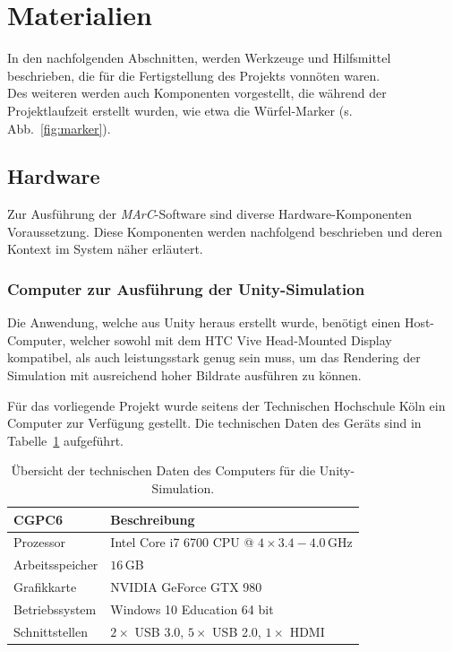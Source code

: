 \section{Materialien}\label{sec:Materialien}
In den nachfolgenden Abschnitten, werden Werkzeuge und Hilfsmittel beschrieben, die für die Fertigstellung des Projekts vonnöten waren.\\ Des weiteren werden auch Komponenten vorgestellt, die während der Projektlaufzeit erstellt wurden, wie etwa die Würfel-Marker (s. Abb.~\ref{fig:marker}).

\subsection{Hardware}
Zur Ausführung der \emph{MArC}-Software sind diverse Hardware-Komponenten Voraussetzung. Diese Komponenten werden nachfolgend beschrieben und deren Kontext im System näher erläutert.
\subsubsection{Computer zur Ausführung der Unity-Simulation}\label{sec:UnityComp}
Die Anwendung, welche aus Unity \cite{website:Unity} heraus erstellt wurde, benötigt einen Host-Computer, welcher sowohl mit dem HTC Vive Head-Mounted Display kompatibel, als auch leistungsstark genug sein muss, um das Rendering der Simulation mit ausreichend hoher Bildrate ausführen zu können.

Für das vorliegende Projekt wurde seitens der Technischen Hochschule Köln ein Computer zur Verfügung gestellt. Die technischen Daten des Geräts sind in Tabelle~\ref{tab:UnityCompParam} aufgeführt.

\begin{table}
	\centering
	\begin{tabular}{|l|l|}
		\hline
		\Absatzbox{}
		\textbf{CGPC6}& \textbf{Beschreibung} \\
		\hline
		Prozessor & Intel Core i7 6700 CPU @ $4\times3.4-4.0$\,GHz \\
		\hline
		Arbeitsspeicher & $16$\,GB \\
 		\hline 
		Grafikkarte & NVIDIA GeForce GTX 980\\
		\hline
		Betriebssystem & Windows 10 Education 64 bit \\
		\hline
		Schnittstellen & $2\times$ USB 3.0, $5\times$ USB 2.0, $1\times $ HDMI\\
		\hline
	\end{tabular}
	\caption{Übersicht der technischen Daten des Computers für die Unity-Simulation.}
	\label{tab:UnityCompParam}
\end{table}

